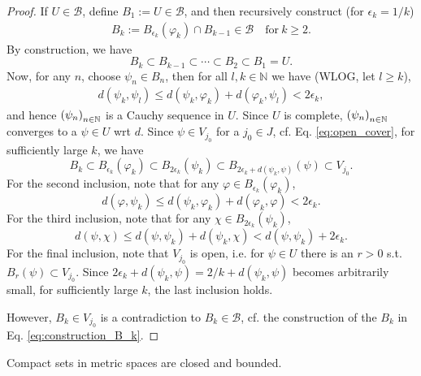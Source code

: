\begin{proof}
	If $U\in\mathcal B$, define $B_1 := U\in\mathcal B$, and then recursively construct (for $\epsilon_k = 1/k$)
	\begin{align}\label{eq:construction_B_k}
		B_k := B_{\epsilon_k}(\varphi_k) \cap B_{k - 1}\in\mathcal B\quad\text{for}\ k\geq 2.
	\end{align}
	By construction, we have
	$$B_{k} \subset B_{k - 1}\subset \cdots\subset B_2\subset B_1 = U.$$
	Now, for any $n$, choose $\psi_n\in B_n$, then for all $l, k\in\mathbb N$ we have (WLOG, let $l\geq k$),
	\begin{align}
		d(\psi_k, \psi_l) \leq d(\psi_k, \varphi_k) + d(\varphi_k, \psi_l) < 2\epsilon_k,
	\end{align}
	and hence $\seq[\psi_n]$ is a Cauchy sequence in $U$. Since $U$ is complete, $\seq[\psi_n]$ converges to a $\psi\in U$ wrt $d$. Since $\psi\in V_{j_0}$ for a $j_{0}\in J$, cf. Eq. \eqref{eq:open_cover}, for sufficiently large $k$, we have
	$$B_k\subset B_{\epsilon_k}(\varphi_k) \subset B_{2\epsilon_k}(\psi_k) \subset B_{2\epsilon_k + d(\psi_k, \psi)}(\psi) \subset V_{j_0}.$$
	For the second inclusion, note that for any $\varphi\in B_{\epsilon_k}(\varphi_k)$, $$d(\varphi, \psi_k) \leq d(\psi_k, \varphi_k) + d(\varphi_k, \varphi) < 2\epsilon_k.$$
	For the third inclusion, note that for any $\chi\in B_{2\epsilon_k}(\psi_k)$, $$d(\psi, \chi) \leq d(\psi, \psi_k) + d(\psi_k, \chi) < d(\psi, \psi_k) + 2\epsilon_k.$$
	For the final inclusion, note that $V_{j_0}$ is open, i.e. for $\psi\in U$ there is an $r > 0$ s.t. $B_{r}(\psi) \subset V_{j_0}$. Since $2\epsilon_k + d(\psi_k, \psi) = 2/k + d(\psi_k, \psi)$ becomes arbitrarily small, for sufficiently large $k$, the last inclusion holds.
	
	However, $B_k\in V_{j_0}$ is a contradiction to $B_k\in\mathcal B$, cf. the construction of the $B_k$ in Eq. \eqref{eq:construction_B_k}.	
\end{proof}

\begin{corollary}
	Compact sets in metric spaces are closed and bounded.
\end{corollary}

